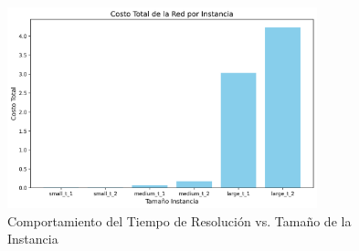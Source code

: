 \documentclass[12pt]{article}
\begin{document}
\begin{figure}[H]
    \centering
    \includegraphics[width=0.8\textwidth]{time_values.png}
    \caption{Comportamiento del Tiempo de Resolución vs. Tamaño de la Instancia}
    \label{fig:tiempo_comportamiento}
\end{figure}
\end{document}
